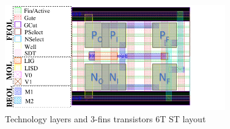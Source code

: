 \documentclass[diss,pgmicro,english]{iiufrgs}
\begin{document}
\begin{figure}[]
\centering
\includegraphics[width=0.85\textwidth, trim={0 0 1.5cm 0},clip]{camadasSTv2.pdf}
\caption{Technology layers and 3-fins transistors 6T ST layout}
\label{fig:layers}
\end{figure}
\end{document}
